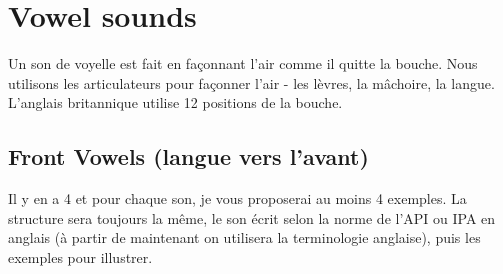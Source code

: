 \documentclass[12pt,a4paper]{book}
\begin{document}
\chapter{\textenglish{Vowel sounds}}
\label{chap:vow}
Un son de voyelle est fait en façonnant l'air comme il quitte la
bouche. Nous utilisons les articulateurs pour façonner l'air - les
lèvres, la mâchoire, la langue. L'anglais britannique utilise 12 positions de la bouche.
\section{\textenglish{Front Vowels} (langue vers l'avant)}
\label{sec:orge433061}
Il y en a 4 et pour chaque son, je vous proposerai au moins 4
exemples. La structure sera toujours la même, le son écrit selon la
norme de l'API ou IPA en anglais (à partir de maintenant on utilisera
la terminologie anglaise), puis les exemples pour illustrer.
\end{document}
